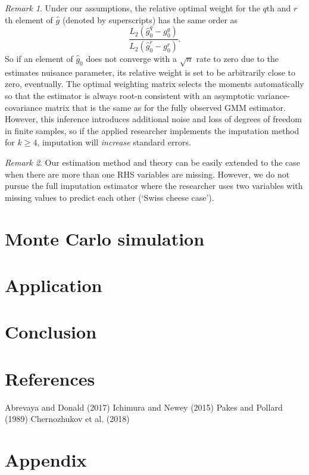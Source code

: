 \documentclass{article}
\theoremstyle{definition}
\theoremstyle{remark}
\newtheorem{remark}{Remark}
\begin{document}
\begin{remark}
	Under our assumptions, the relative optimal weight for the $q$th and $r$th element of $\hat{g}$ (denoted by superscripts) has the same order as
	\[\frac{L_2(\hat{g}_0^q-g_0^q)}{L_2(\hat{g}_0^r-g_0^r)}.
	\]
	So if an element of $\hat{g}_0$ does not converge with a $\sqrt{n}$ rate to zero due to the estimates nuisance parameter, its relative weight is set to be arbitrarily close to zero, eventually. The optimal weighting matrix selects the moments automatically so that the estimator is always root-n consistent with an asymptotic variance-covariance matrix that is the same as for the fully observed GMM estimator.\\
	However, this inference introduces additional noise and loss of degrees of freedom in finite samples, so if the applied researcher implements the imputation method for $k\geq 4$, imputation will \textit{increase} standard errors. 
\end{remark}

\begin{remark}
	Our estimation method and theory can be easily extended to the case when there are more than one RHS variables are missing. However, we do not pursue the full imputation estimator where the researcher uses two variables with missing values to predict each other (`Swiss cheese case').
\end{remark}

\section{Monte Carlo simulation}


\section{Application}


\section{Conclusion}

\section{References}

Abrevaya and Donald (2017)
Ichimura and Newey (2015)
Pakes and Pollard (1989)
Chernozhukov et al. (2018)

\section{Appendix}
\end{document}

